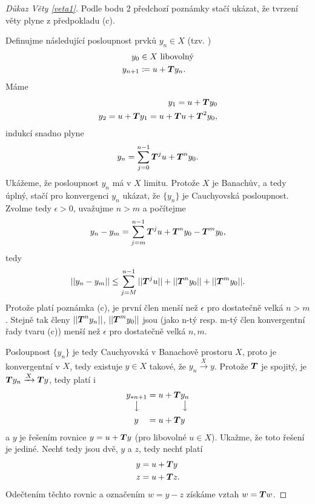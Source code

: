 \begin{proof}[Důkaz Věty \ref{veta1}]
Podle bodu 2 předchozí poznámky stačí ukázat, že tvrzení věty plyne  z předpokladu (c).

Definujme následující posloupnost prvků $y_n\in X$ (tzv. )
\begin{equation*}
    \begin{split}
    y_0&\in X \text{ libovolný}\\
    y_{n+1}&\coloneqq u+ \boldsymbol{T} y_n.
    \end{split}
\end{equation*}
Máme 
\begin{equation*}
    \begin{split}
    y_1=u+ \boldsymbol{T} y_0\\
    y_2=u+ \boldsymbol{T} y_1=u+ \boldsymbol{T} u+ \boldsymbol{T} ^2y_0,
    \end{split}
\end{equation*}
indukcí snadno plyne
\begin{equation}
    y_n=\sum\limits_{j=0}^{n-1} \boldsymbol{T} ^ju+ \boldsymbol{T} ^ny_0.    \label{eq:yn_suma}
\end{equation}
Ukážeme, že posloupnost $y_n$ má v $X$ limitu. Protože $X$ je Banachův, a tedy úplný, stačí pro konvergenci $y_n$ ukázat, že $\{y_n\}$ je Cauchyovská posloupnost. Zvolme tedy $\epsilon>0$, uvažujme $n>m$ a počítejme
$$y_n-y_m=\sum\limits_{j=m}^{n-1} \boldsymbol{T} ^ju+ \boldsymbol{T} ^ny_0- \boldsymbol{T} ^my_0,$$
tedy $$||y_n-y_m||\leq \sum\limits_{j=M}^{n-1}|| \boldsymbol{T} ^ju||+|| \boldsymbol{T} ^ny_0||+|| \boldsymbol{T} ^my_0||.$$
Protože platí poznámka (c), je první člen menší než $\epsilon$ pro dostatečně velká $n>m$. Stejně tak členy $|| \boldsymbol{T} ^ny_n||$, $|| \boldsymbol{T} ^my_0||$ jsou (jako n-tý resp. m-tý člen konvergentní řady tvaru (c)) menší než $\epsilon$ pro dostatečně velká $n,m$. 

Posloupnost $\{y_n\}$ je tedy Cauchyovská v Banachově prostoru $X$, proto je konvergentní v $X$, tedy existuje $y\in X$ takové, že $y_n\xrightarrow{X} y$. Protože $ \boldsymbol{T} $ je spojitý, je $ \boldsymbol{T} y_n\xrightarrow{X} \boldsymbol{T} y$, tedy platí i 
\begin{equation*}
    \begin{split}
        \underset{\big\downarrow}{y_{*n+1}}&=u+ \boldsymbol{T} \underset{\big\downarrow }{y_n}\\
        y\quad&=u+ \boldsymbol{T} y
    \end{split}
\end{equation*}
a $y$ je řešením rovnice $y=u+ \boldsymbol{T} y$ (pro libovolné $u\in X$). Ukažme, že toto řešení je jediné. Nechť tedy jsou dvě, $y$ a $z$, tedy nechť platí 
\begin{equation*}
    \begin{split}
        y&=u+ \boldsymbol{T} y\\
        z&=u+ \boldsymbol{T} z.
    \end{split}
\end{equation*}
Odečtením těchto rovnic a označením $w=y-z$ získáme vztah $w= \boldsymbol{T} w$. 


\end{proof}
